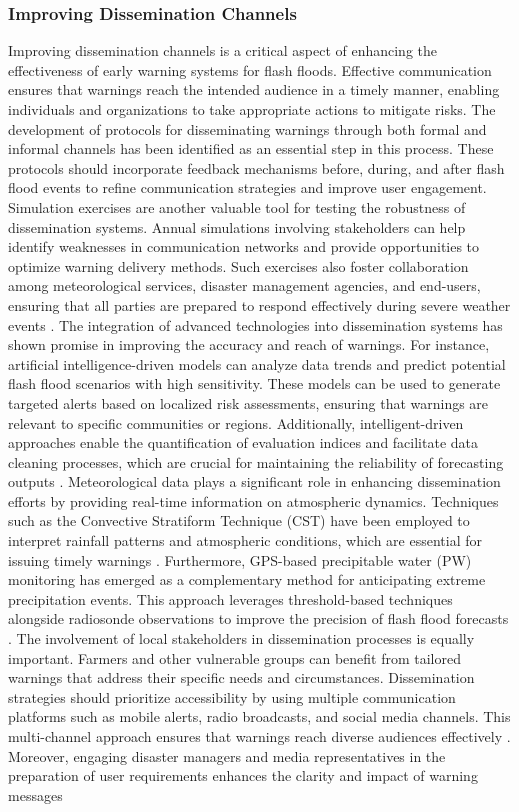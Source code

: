 \subsubsection{Improving Dissemination Channels}
Improving dissemination channels is a critical aspect of enhancing the effectiveness of early warning systems for flash floods. Effective communication ensures that warnings reach the intended audience in a timely manner, enabling individuals and organizations to take appropriate actions to mitigate risks. The development of protocols for disseminating warnings through both formal and informal channels has been identified as an essential step in this process. These protocols should incorporate feedback mechanisms before, during, and after flash flood events to refine communication strategies and improve user engagement. Simulation exercises are another valuable tool for testing the robustness of dissemination systems. Annual simulations involving stakeholders can help identify weaknesses in communication networks and provide opportunities to optimize warning delivery methods. Such exercises also foster collaboration among meteorological services, disaster management agencies, and end-users, ensuring that all parties are prepared to respond effectively during severe weather events \citep{Jubach2016}. The integration of advanced technologies into dissemination systems has shown promise in improving the accuracy and reach of warnings. For instance, artificial intelligence-driven models can analyze data trends and predict potential flash flood scenarios with high sensitivity. These models can be used to generate targeted alerts based on localized risk assessments, ensuring that warnings are relevant to specific communities or regions. Additionally, intelligent-driven approaches enable the quantification of evaluation indices and facilitate data cleaning processes, which are crucial for maintaining the reliability of forecasting outputs \citep{Yang2022}. Meteorological data plays a significant role in enhancing dissemination efforts by providing real-time information on atmospheric dynamics. Techniques such as the Convective Stratiform Technique (CST) have been employed to interpret rainfall patterns and atmospheric conditions, which are essential for issuing timely warnings \citep{AlRawas2024}. Furthermore, GPS-based precipitable water (PW) monitoring has emerged as a complementary method for anticipating extreme precipitation events. This approach leverages threshold-based techniques alongside radiosonde observations to improve the precision of flash flood forecasts \citep{Zanchetta2020}. The involvement of local stakeholders in dissemination processes is equally important. Farmers and other vulnerable groups can benefit from tailored warnings that address their specific needs and circumstances. Dissemination strategies should prioritize accessibility by using multiple communication platforms such as mobile alerts, radio broadcasts, and social media channels. This multi-channel approach ensures that warnings reach diverse audiences effectively \citep{Msigwa2024}. Moreover, engaging disaster managers and media representatives in the preparation of user requirements enhances the clarity and impact of warning messages 